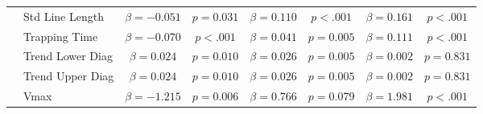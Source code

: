 \begin{tabular}{llcc|cc|cc}
 & Std Line Length & $\beta = -0.051$ & $p = 0.031$ & $\beta = 0.110$ & $p < .001$ & $\beta = 0.161$ & $p < .001$ \\
 & Trapping Time & $\beta = -0.070$ & $p < .001$ & $\beta = 0.041$ & $p = 0.005$ & $\beta = 0.111$ & $p < .001$ \\
 & Trend Lower Diag & $\beta = 0.024$ & $p = 0.010$ & $\beta = 0.026$ & $p = 0.005$ & $\beta = 0.002$ & $p = 0.831$ \\
 & Trend Upper Diag & $\beta = 0.024$ & $p = 0.010$ & $\beta = 0.026$ & $p = 0.005$ & $\beta = 0.002$ & $p = 0.831$ \\
 & Vmax & $\beta = -1.215$ & $p = 0.006$ & $\beta = 0.766$ & $p = 0.079$ & $\beta = 1.981$ & $p < .001$ \\
\midrule
\bottomrule
\end{tabular}